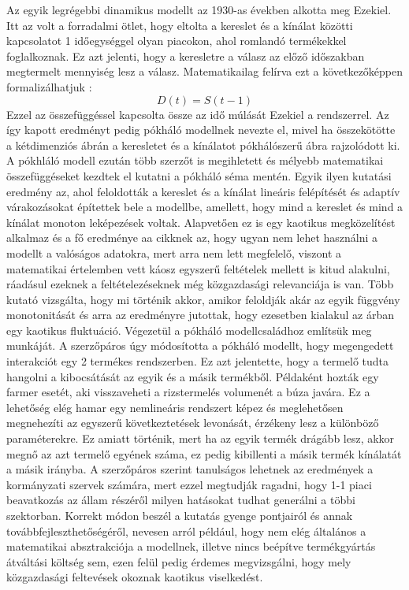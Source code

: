 \documentclass{article}
\theoremstyle{definition}
\theoremstyle{theorem}
\begin{document}
Az egyik legrégebbi dinamikus modellt \cite{Ezekiel} az 1930-as években alkotta meg Ezekiel. Itt az volt a forradalmi ötlet, hogy eltolta a kereslet és a kínálat közötti kapcsolatot 1 időegységgel olyan piacokon, ahol romlandó termékekkel foglalkoznak. Ez azt jelenti, hogy a keresletre a válasz az előző időszakban megtermelt mennyiség lesz a válasz. Matematikailag felírva ezt a következőképpen formalizálhatjuk :
\begin{equation*}
    D(t) = S(t-1)
\end{equation*}
Ezzel az összefüggéssel kapcsolta össze az idő múlását Ezekiel a rendszerrel. Az így kapott eredményt pedig pókháló modellnek nevezte el, mivel ha összekötötte a kétdimenziós ábrán a keresletet és a kínálatot pókhálószerű ábra rajzolódott ki. A pókhláló modell ezután több szerzőt is megihletett és mélyebb matematikai összefüggéseket kezdtek el kutatni a pókháló séma mentén. Egyik ilyen kutatási eredmény \cite{HOMMES1994315} az, ahol feloldották a kereslet és a kínálat lineáris felépítését és adaptív várakozásokat építettek bele a modellbe, amellett, hogy mind a kereslet és mind a kínálat monoton leképezések voltak. Alapvetően ez is egy kaotikus megközelítést alkalmaz és a fő eredménye aa cikknek az, hogy ugyan nem lehet használni a modellt a valóságos adatokra, mert arra nem lett megfelelő, viszont a matematikai értelemben vett káosz egyszerű feltételek mellett is kitud alakulni, ráadásul ezeknek a feltételezéseknek még közgazdasági relevanciája is van. Több kutató vizsgálta, hogy mi történik akkor, amikor feloldják akár az egyik függvény monotonitását \cite{Artstein1983} \cite{JENSEN1984235} \cite{LICHTENBERG1989225} és arra az eredményre jutottak, hogy ezesetben kialakul az árban egy kaotikus fluktuáció. Végezetül a pókháló modellcsaládhoz említsük meg \cite{DIECI20092011} munkáját. A szerzőpáros úgy módosította a pókháló modellt, hogy megengedett interakciót egy 2 termékes rendszerben. Ez azt jelentette, hogy a termelő tudta hangolni a kibocsátását az egyik és a másik termékből. Példaként hozták egy farmer esetét, aki visszaveheti a rizstermelés volumenét a búza javára. Ez a lehetőség elég hamar egy nemlineáris rendszert képez és meglehetősen megnehezíti az egyszerű következtetések levonását, érzékeny lesz a különböző paraméterekre. Ez amiatt történik, mert ha az egyik termék drágább lesz, akkor megnő az azt termelő egyének száma, ez pedig kibillenti a másik termék kínálatát a másik irányba. A szerzőpáros szerint tanulságos lehetnek az eredmények a kormányzati szervek számára, mert ezzel megtudják ragadni, hogy 1-1 piaci beavatkozás az állam részéről milyen hatásokat tudhat generálni a többi szektorban. Korrekt módon beszél a kutatás gyenge pontjairól és annak továbbfejleszthetőségéről, nevesen arról például, hogy nem elég általános a matematikai absztrakciója a modellnek, illetve nincs beépítve termékgyártás átváltási költség sem, ezen felül pedig érdemes megvizsgálni, hogy mely közgazdasági feltevések okoznak kaotikus viselkedést.
\end{document}
